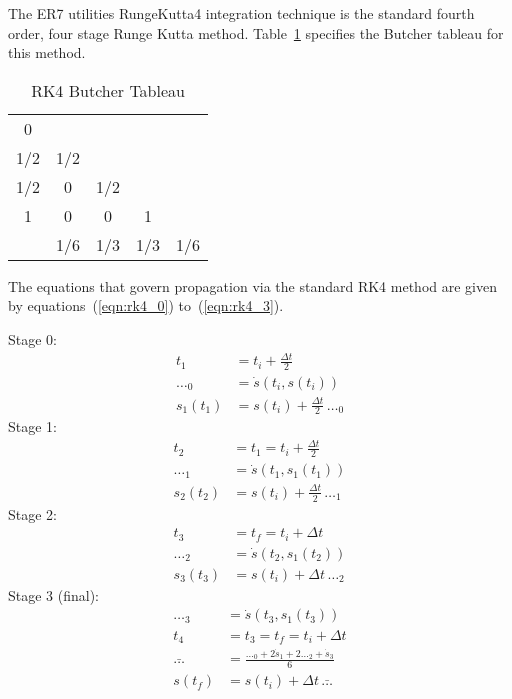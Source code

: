 The ER7 utilities RungeKutta4 integration technique is the standard
fourth order, four stage Runge Kutta method.
Table~\ref{tab:rk4_butcher} specifies the Butcher tableau for this method.
 
\begin{table}[htp]
\centering
\caption{RK4 Butcher Tableau}
\label{tab:rk4_butcher}
\vspace{1.5ex}
\begin{tabular}{c|cccc}
0 &&&& \\
1/2 & 1/2 &&& \\
1/2 & 0 & 1/2 && \\
1 & 0 & 0 & 1 & \\
\hline
& 1/6 & 1/3 & 1/3 & 1/6 
\end{tabular}
\end{table}

The equations that govern propagation via the standard RK4 method are given by
equations~(\ref{eqn:rk4_0}) to~(\ref{eqn:rk4_3}).

Stage 0:
\begin{equation}
\label{eqn:rk4_0}
\begin{split}
t_1 &= t_i + \frac{\Delta t}2 \\
\dots_0 &= \dot s(t_i,s(t_i)) \\
s_1(t_1) &= s(t_i) + \frac{\Delta t}2 \, \dots_0
\end{split}
\end{equation}
Stage 1:
\begin{equation}
\label{eqn:rk4_1}
\begin{split}
t_2 &= t_1 = t_i + \frac{\Delta t}2 \\
\dots_1 &= \dot s(t_1,s_1(t_1)) \\
s_2(t_2) &= s(t_i) + \frac{\Delta t}2 \, \dots_1
\end{split}
\end{equation}
Stage 2:
\begin{equation}
\label{eqn:rk4_2}
\begin{split}
t_3 &= t_f = t_i + \Delta t \\
\dots_2 &= \dot s(t_2,s_1(t_2)) \\
s_3(t_3) &= s(t_i) + \Delta t \, \dots_2
\end{split}
\end{equation}
Stage 3 (final):
\begin{equation}
\label{eqn:rk4_3}
\begin{split}
\dots_3 &= \dot s(t_3,s_1(t_3)) \\
t_4 &= t_3 = t_f = t_i + \Delta t \\
\bar {\dots} &=
  \frac{\dots_0 + 2\dot s_1 + 2\dots_2+\dot s_3} 6 \\
s(t_f) &= s(t_i) + \Delta t \, \bar {\dots}
\end{split}
\end{equation}


